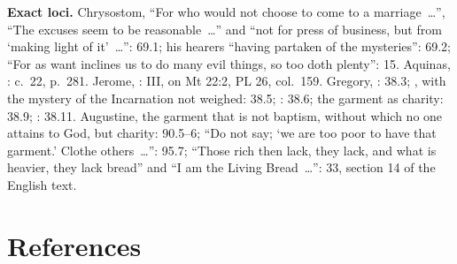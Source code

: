 {\textbf{Exact loci.} Chrysostom, ``For who would not choose to come to a
marriage~\ldots'', ``The excuses seem to be reasonable~\ldots'' and ``not for
press of business, but from `making light of it'~\ldots'':  69.1; his hearers ``having partaken of the mysteries'': 69.2;
``For as want inclines us to do many evil things, so too doth plenty'':
 15.
Aquinas, :
 c.~22, p.~281. Jerome, :  III, on Mt 22:2, PL 26,
col.~159. Gregory, :  38.3; ,
with the mystery of the Incarnation not weighed: 38.5; :
38.6; the garment as charity: 38.9; : 38.11. Augustine, the garment that is not
baptism, without which no one attains to God, but charity: 
90.5--6; ``Do not say; `we are too poor to
have that garment.' Clothe others~\ldots'':  95.7; ``Those rich
then lack, they lack, and what is heavier, they lack bread'' and ``I am the
Living Bread~\ldots'':  33, section 14 of the
English text.

\par}

\section*{References}

